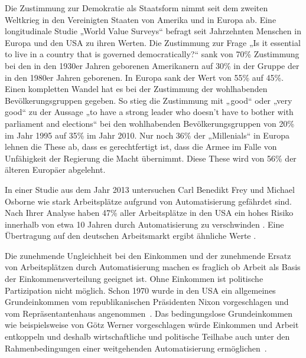 \documentclass[paper=a4,oneside,abstract]{scrartcl}
\begin{document}
Die Zustimmung zur Demokratie als Staatsform nimmt seit dem zweiten Weltkrieg in den Vereinigten Staaten von Amerika und in Europa ab. Eine longitudinale Studie „World Value Surveys“ befragt seit Jahrzehnten Menschen in Europa und den USA zu ihren Werten. Die Zustimmung zur Frage „Is it essential to live in a country that is governed democratically?“ sank von 70\% Zustimmung bei den in den 1930er Jahren geborenen Amerikanern auf 30\% in der Gruppe der in den 1980er Jahren geborenen. In Europa sank der Wert von 55\% auf 45\%. Einen kompletten Wandel hat es bei der Zustimmung der wohlhabenden Bevölkerungsgruppen gegeben. So stieg die Zustimmung mit „good“ oder „very good“ zu der Aussage „to have a strong leader who doesn't have to bother with parliament and elections“ bei den wohlhabenden Bevölkerungsgruppen von 20\% im Jahr 1995 auf 35\% im Jahr 2010. Nur noch 36\% der „Millenials“ in Europa lehnen die These ab, dass es gerechtfertigt ist, dass die Armee im Falle von Unfähigkeit der Regierung die Macht übernimmt. Diese These wird von 56\% der älteren Europäer abgelehnt. \cite{foa16}

In einer Studie aus dem Jahr 2013 untersuchen Carl Benedikt Frey und Michael Osborne wie stark Arbeitsplätze aufgrund von Automatisierung gefährdet sind. Nach Ihrer Analyse haben 47\% aller Arbeitsplätze in den USA ein hohes Risiko innerhalb von etwa 10 Jahren durch Automatisierung zu verschwinden \cite{frey17}\cite{frey13}. Eine Übertragung auf den deutschen Arbeitsmarkt ergibt ähnliche Werte \cite{bonin15}.

Die zunehmende Ungleichheit bei den Einkommen und der zunehmende Ersatz von Arbeitsplätzen durch Automatisierung machen es fraglich ob Arbeit als Basis der Einkommensverteilung geeignet ist. Ohne Einkommen ist politische Partizipation nicht möglich. Schon 1970 wurde in den USA ein allgemeines Grundeinkommen vom republikanischen Präsidenten Nixon vorgeschlagen und vom Repräsentantenhaus angenommen~\cite{weaver70}. Das bedingungslose Grundeinkommen wie beispielsweise von Götz Werner vorgeschlagen würde Einkommen und Arbeit entkoppeln und deshalb wirtschaftliche und politische Teilhabe auch unter den Rahmenbedingungen einer weitgehenden Automatisierung ermöglichen~\cite{werner08}.

\printbibliography
\end{document}
